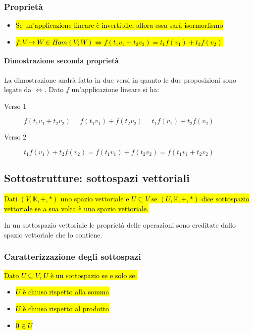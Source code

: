 \subsubsection{Proprietà}
\begin{itemize}
    \item \hl{Se un'applicazione lineare è invertibile, allora essa sarà isormorfismo}
    \item \hl{$f: V \to W \in Hom(V; W) \iff f(t_1v_1 + t_2v_2) = t_1f(v_1) + t_2f(v_2)$}
\end{itemize}

\paragraph{Dimostrazione seconda proprietà} La dimostrazione andrà fatta in due
versi in quanto le due proposizioni sono legate da $\iff$. Dato $f$ un'applicazione
lineare si ha:
\begin{description}
    \item[Verso 1] $f(t_1v_1 + t_2v_2) = f(t_1v_1) + f(t_2v_2) = t_1f(v_1) + t_2f(v_2)$
    \item[Verso 2] $t_1f(v_1) + t_2f(v_2) = f(t_1v_1) + f(t_2v_2) = f(t_1v_1 + t_2v_2)$
\end{description}

\subsection{Sottostrutture: sottospazi vettoriali}
\hl{ Dati $(V, \mathbb{K}, +, *)$ uno spazio vettoriale e $U \subseteq V$ se
$(U, \mathbb{K}, +, *)$ dice sottospazio vettoriale se a sua volta è uno spazio
vettoriale.}

In un sottospazio vettoriale le proprietà delle operazioni sono ereditate dallo
spazio vettoriale che lo contiene.

\subsubsection{Caratterizzazione degli sottospazi}
\hl{Dato $U \subseteq V$, $U$ è un sottospazio se e solo se:}
\begin{itemize}
    \item \hl{$U$ è chiuso rispetto alla somma}
    \item \hl{$U$ è chiuso rispetto al prodotto}
    \item \hl{$\underline{0} \in U$}
\end{itemize}

